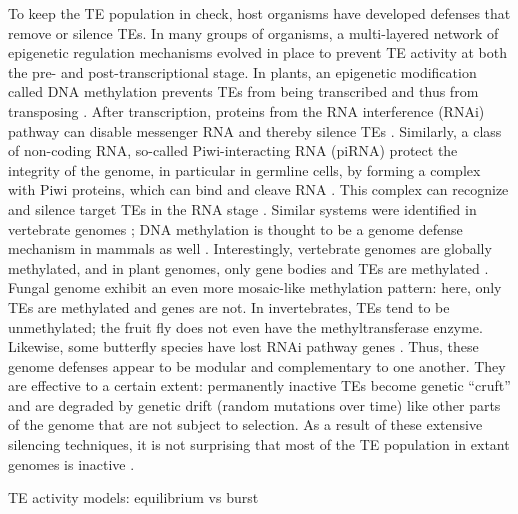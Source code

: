 To keep the TE population in check, host organisms have developed
defenses that remove or silence TEs. In many groups of organisms, a
multi-layered network of epigenetic regulation mechanisms evolved in
place to prevent TE activity at both the pre- and post-transcriptional
stage. In plants, an epigenetic modification called DNA methylation
prevents TEs from being transcribed and thus from transposing
\citep{Slotkin2007, Lisch2009}. After transcription, proteins from the
RNA interference (RNAi) pathway can disable messenger RNA and thereby
silence TEs \citep{Buchon2006}. Similarly, a class of non-coding RNA,
so-called Piwi-interacting RNA (piRNA) protect the integrity of the
genome, in particular in germline cells, by forming a complex with Piwi
proteins, which can bind and cleave RNA \citep{Zeng2011}. This complex
can recognize and silence target TEs in the RNA stage \citep{Siomi2011}.
Similar systems were identified in vertebrate genomes \citep{Suzuki2008,
Shuebeler2015}; DNA methylation is thought to be a genome defense
mechanism in mammals as well \citep{Yoder1997}. Interestingly,
vertebrate genomes are globally methylated, and in plant genomes, only
gene bodies and TEs are methylated \citep{Suzuki2008}. Fungal genome
exhibit an even more mosaic-like methylation pattern: here, only TEs are
methylated and genes are not. In invertebrates, TEs tend to be
unmethylated; the fruit fly  does not
even have the methyltransferase enzyme. Likewise, some butterfly species
have lost RNAi pathway genes \citep{Pauli2016}. Thus, these genome
defenses appear to be modular and complementary to one another. They are
effective to a certain extent: permanently inactive TEs become genetic
``cruft'' and are degraded by genetic drift (random mutations over time)
like other parts of the genome that are not subject to selection. As a
result of these extensive silencing techniques, it is not surprising
that most of the TE population in extant genomes is inactive
\citep{Yoder1997, Zilberman2007}.

TE activity models: equilibrium vs burst
